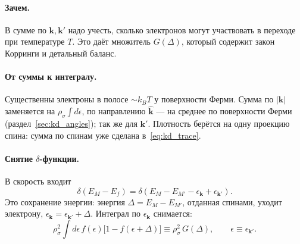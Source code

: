 \paragraph{Зачем.} В сумме по $\mathbf k,\mathbf k'$ надо учесть, сколько электронов
могут участвовать в переходе при температуре $T$. Это даёт множитель
$G(\Delta)$, который содержит закон Корринги и детальный баланс.

\paragraph{От суммы к интегралу.} Существенны электроны в полосе $\sim k_BT$ у
поверхности Ферми. Сумма по $|\mathbf k|$ заменяется на $\rho_\sigma\int d\epsilon$, по
направлению $\hat{\mathbf k}$ --- на среднее по поверхности Ферми
(раздел~\ref{sec:kd_angles}); так же для $\mathbf k'$. Плотность берётся на одну
проекцию спина: сумма по спинам уже сделана в~\eqref{eq:kd_trace}.

\paragraph{Снятие $\delta$-функции.} В скорость входит
\[
\delta(E_M-E_f)=\delta(E_M-E_{M'}-\epsilon_{\mathbf k}+\epsilon_{\mathbf k'}) .
\]
Это сохранение энергии: энергия $\Delta=E_M-E_{M'}$, отданная спинами, уходит
электрону, $\epsilon_{\mathbf k}=\epsilon_{\mathbf k'}+\Delta$. Интеграл по $\epsilon_{\mathbf k}$ снимается:
\[
\rho_\sigma^2\int d\epsilon\,f(\epsilon)\big[1-f(\epsilon+\Delta)\big]\equiv\rho_\sigma^2\,G(\Delta),
\qquad \epsilon\equiv\epsilon_{\mathbf k'} .
\]

